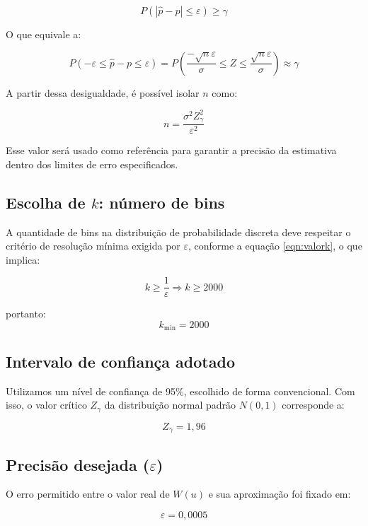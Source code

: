 \documentclass[12pt, a4paper]{article}
\begin{document}
\[
P(|\hat{p} - p| \leq \varepsilon) \geq \gamma
\] 

O que equivale a:

\[
P\left(-\varepsilon \leq \hat{p} - p \leq \varepsilon\right) = P\left( \frac{-\sqrt{n}\varepsilon}{\sigma} \leq Z \leq \frac{\sqrt{n}\varepsilon}{\sigma} \right) \approx \gamma
\]

A partir dessa desigualdade, é possível isolar \( n \) como:

\begin{equation}
    n = \frac{\sigma^2 Z_\gamma^2}{\varepsilon^2}
    \label{eqn:valorn}
\end{equation}

Esse valor será usado como referência para garantir a precisão da estimativa dentro dos limites de erro especificados.

\subsection{Escolha de \( k \): número de bins}

A quantidade de bins na distribuição de probabilidade discreta deve respeitar o critério de resolução mínima exigida por \( \varepsilon \), conforme a equação \ref{eqn:valork}, o que implica:

\begin{equation}
    k \geq \frac{1}{\varepsilon} \Rightarrow k \geq 2000
    \label{eqn:valork}
\end{equation}

portanto:
\[
k_{\text{min}} = 2000
\]


\subsection{Intervalo de confiança adotado}

Utilizamos um nível de confiança de 95\%, escolhido de forma convencional. Com isso, o valor crítico \( Z_\gamma \) da distribuição normal padrão \( N(0,1) \) corresponde a:

\[
Z_\gamma = 1{,}96
\]

\subsection{Precisão desejada (\( \varepsilon \))}

O erro permitido entre o valor real de \( W(u) \) e sua aproximação foi fixado em:

\[
\varepsilon = 0{,}0005
\]
\end{document}
